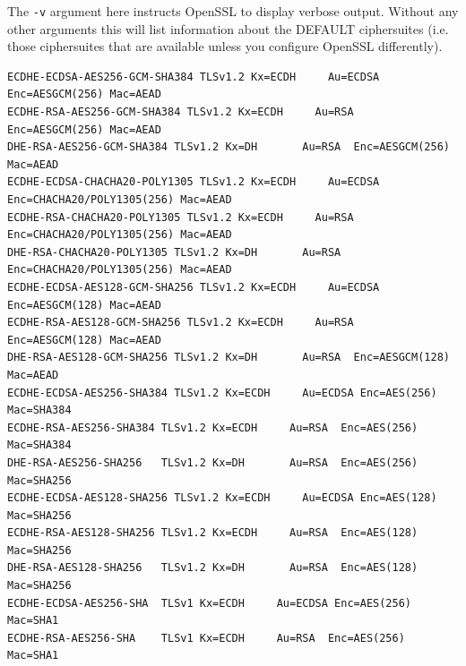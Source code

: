 The \lstinline!-v! argument here instructs OpenSSL to display verbose output.
Without any other arguments this will list information about the DEFAULT
ciphersuites (i.e. those ciphersuites that are available unless you configure
OpenSSL differently).

\begin{lstlisting}[float=tb,label=lst:ciphers-extract,caption=An
extract from \lstinline!openssl ciphers -v! output]
ECDHE-ECDSA-AES256-GCM-SHA384 TLSv1.2 Kx=ECDH     Au=ECDSA Enc=AESGCM(256) Mac=AEAD
ECDHE-RSA-AES256-GCM-SHA384 TLSv1.2 Kx=ECDH     Au=RSA  Enc=AESGCM(256) Mac=AEAD
DHE-RSA-AES256-GCM-SHA384 TLSv1.2 Kx=DH       Au=RSA  Enc=AESGCM(256) Mac=AEAD
ECDHE-ECDSA-CHACHA20-POLY1305 TLSv1.2 Kx=ECDH     Au=ECDSA Enc=CHACHA20/POLY1305(256) Mac=AEAD
ECDHE-RSA-CHACHA20-POLY1305 TLSv1.2 Kx=ECDH     Au=RSA  Enc=CHACHA20/POLY1305(256) Mac=AEAD
DHE-RSA-CHACHA20-POLY1305 TLSv1.2 Kx=DH       Au=RSA  Enc=CHACHA20/POLY1305(256) Mac=AEAD
ECDHE-ECDSA-AES128-GCM-SHA256 TLSv1.2 Kx=ECDH     Au=ECDSA Enc=AESGCM(128) Mac=AEAD
ECDHE-RSA-AES128-GCM-SHA256 TLSv1.2 Kx=ECDH     Au=RSA  Enc=AESGCM(128) Mac=AEAD
DHE-RSA-AES128-GCM-SHA256 TLSv1.2 Kx=DH       Au=RSA  Enc=AESGCM(128) Mac=AEAD
ECDHE-ECDSA-AES256-SHA384 TLSv1.2 Kx=ECDH     Au=ECDSA Enc=AES(256)  Mac=SHA384
ECDHE-RSA-AES256-SHA384 TLSv1.2 Kx=ECDH     Au=RSA  Enc=AES(256)  Mac=SHA384
DHE-RSA-AES256-SHA256   TLSv1.2 Kx=DH       Au=RSA  Enc=AES(256)  Mac=SHA256
ECDHE-ECDSA-AES128-SHA256 TLSv1.2 Kx=ECDH     Au=ECDSA Enc=AES(128)  Mac=SHA256
ECDHE-RSA-AES128-SHA256 TLSv1.2 Kx=ECDH     Au=RSA  Enc=AES(128)  Mac=SHA256
DHE-RSA-AES128-SHA256   TLSv1.2 Kx=DH       Au=RSA  Enc=AES(128)  Mac=SHA256
ECDHE-ECDSA-AES256-SHA  TLSv1 Kx=ECDH     Au=ECDSA Enc=AES(256)  Mac=SHA1
ECDHE-RSA-AES256-SHA    TLSv1 Kx=ECDH     Au=RSA  Enc=AES(256)  Mac=SHA1
\end{lstlisting}


